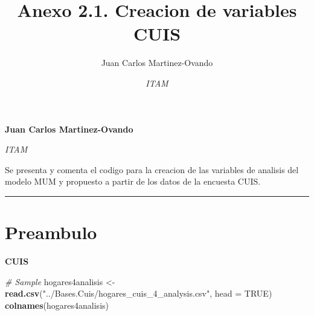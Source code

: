 \documentclass[11pt,]{article}
\title{Anexo 2.1. Creacion de variables CUIS  }
\author{\Large Juan Carlos Martinez-Ovando\vspace{0.05in} \newline\normalsize\emph{}   \and \Large \vspace{0.05in} \newline\normalsize\emph{ITAM}  }
\date{}
\newcommand*{\authorfont}{\fontfamily{phv}\selectfont}
\renewenvironment{abstract}
 {{%
    \setlength{\leftmargin}{0mm}
    \setlength{\rightmargin}{\leftmargin}%
  }%
  \relax}
 {\endlist}
\newenvironment{Shaded}{\begin{snugshade}}{\end{snugshade}}
\newcommand{\KeywordTok}[1]{\textcolor[rgb]{0.13,0.29,0.53}{\textbf{#1}}}
\newcommand{\DataTypeTok}[1]{\textcolor[rgb]{0.13,0.29,0.53}{#1}}
\newcommand{\StringTok}[1]{\textcolor[rgb]{0.31,0.60,0.02}{#1}}
\newcommand{\CommentTok}[1]{\textcolor[rgb]{0.56,0.35,0.01}{\textit{#1}}}
\newcommand{\OtherTok}[1]{\textcolor[rgb]{0.56,0.35,0.01}{#1}}
\newcommand{\NormalTok}[1]{#1}
\begin{document}
	
%

{%
\setlength{\parindent}{0pt}
\thispagestyle{plain}
{\fontsize{18}{20}\selectfont\raggedright 
\maketitle  %

}

{
   \vskip 13.5pt\relax \normalsize\fontsize{11}{12} 
\textbf{\authorfont Juan Carlos Martinez-Ovando} \hskip 15pt \emph{\small }   \par \textbf{\authorfont } \hskip 15pt \emph{\small ITAM}   

}

}








\begin{abstract}

    \hbox{\vrule height .2pt width 39.14pc}

    \vskip 8.5pt %

\noindent Se presenta y comenta el codigo para la creacion de las variables de
analisis del modelo MUM y propuesto a partir de los datos de la encuesta
CUIS.


    \hbox{\vrule height .2pt width 39.14pc}


\end{abstract}


\vskip 6.5pt


\noindent  \begin{center}\rule{0.5\linewidth}{\linethickness}\end{center}

\section{Preambulo}\label{preambulo}

\textbf{CUIS}

\begin{Shaded}
\begin{Highlighting}[]
\CommentTok{# Sample}
\NormalTok{hogares4analisis <-}\StringTok{ }\KeywordTok{read.csv}\NormalTok{(}\StringTok{"../Bases.Cuis/hogares_cuis_4_analysis.csv"}\NormalTok{, }
                             \DataTypeTok{head =} \OtherTok{TRUE}\NormalTok{)}
\KeywordTok{colnames}\NormalTok{(hogares4analisis)}
\end{Highlighting}
\end{Shaded}
\end{document}
